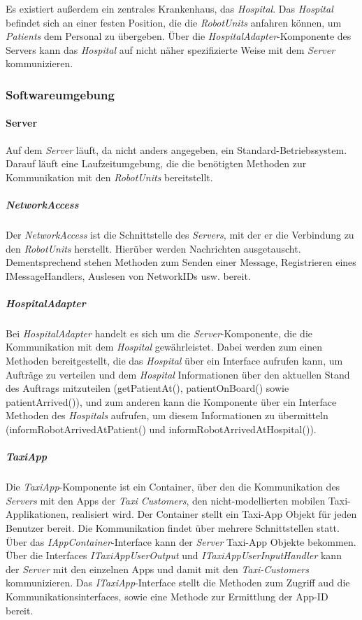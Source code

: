     Es existiert außerdem ein zentrales Krankenhaus, das \emph{Hospital}.
    Das \emph{Hospital} befindet sich an einer festen Position, die die \emph{RobotUnits} anfahren können, um \emph{Patients} dem Personal zu übergeben.
    Über die \emph{HospitalAdapter}-Komponente des Servers kann das \emph{Hospital} auf nicht näher spezifizierte Weise mit dem \emph{Server} kommunizieren.

  \subsubsection{Softwareumgebung}

    \paragraph{Server}\label{server}
    		Auf dem \emph{Server} läuft, da nicht anders angegeben, ein Standard-Betriebssystem.
    		Darauf läuft eine Laufzeitumgebung, die die benötigten Methoden zur Kommunikation mit den \emph{RobotUnits} bereitstellt.
    	\subparagraph{NetworkAccess}\label{networkaccess}
    		Der \emph{NetworkAccess} ist die Schnittstelle des \emph{Servers}, mit der er die Verbindung zu den \emph{RobotUnits} herstellt.
        Hierüber werden Nachrichten ausgetauscht.
    		Dementsprechend stehen Methoden zum Senden einer Message, Registrieren eines IMessageHandlers, Auslesen von NetworkIDs usw. bereit.
    	\subparagraph{HospitalAdapter}\label{hospital}
    		Bei \emph{HospitalAdapter} handelt es sich um die \emph{Server}-Komponente, die die Kommunikation mit dem \emph{Hospital} gewährleistet.
    		Dabei werden zum einen Methoden bereitgestellt, die das \emph{Hospital} über ein Interface aufrufen kann, um Aufträge zu verteilen und dem \emph{Hospital} Informationen über den aktuellen Stand des Auftrags mitzuteilen (getPatientAt(), patientOnBoard() sowie patientArrived()), und zum anderen kann die Komponente über ein Interface Methoden des \emph{Hospitals} aufrufen, um diesem Informationen zu übermitteln (informRobotArrivedAtPatient() und informRobotArrivedAtHospital()).
      \subparagraph{TaxiApp}
        Die \emph{TaxiApp}-Komponente ist ein Container, über den die Kommunikation des \emph{Servers} mit den Apps der \emph{Taxi Customers}, den nicht-modellierten mobilen Taxi-Applikationen, realisiert wird.
        Der Container stellt ein Taxi-App Objekt für jeden Benutzer bereit.
        Die Kommunikation findet über mehrere Schnittstellen statt.
        Über das \emph{IAppContainer}-Interface kann der \emph{Server} Taxi-App Objekte bekommen.
        Über die Interfaces \emph{ITaxiAppUserOutput} und \emph{ITaxiAppUserInputHandler} kann der \emph{Server} mit den einzelnen Apps und damit mit den \emph{Taxi-Customers} kommunizieren.
        Das \emph{ITaxiApp}-Interface stellt die Methoden zum Zugriff aud die Kommunikationsinterfaces, sowie eine Methode zur Ermittlung der App-ID bereit.

